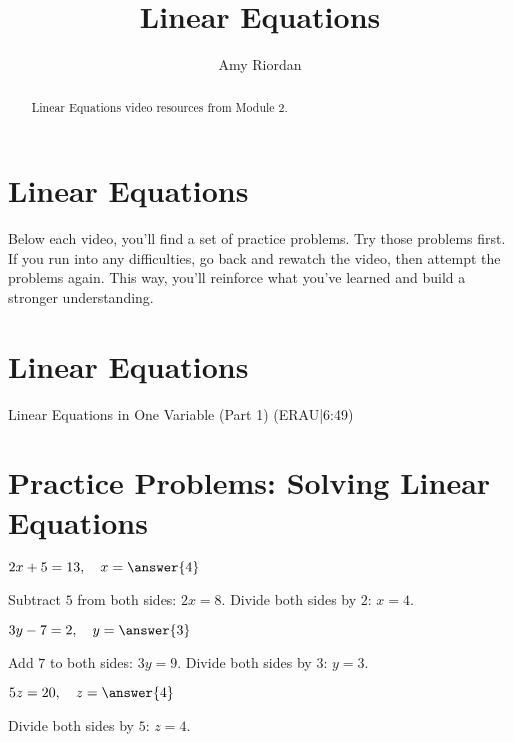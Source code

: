 \documentclass{ximera}
\title{Linear Equations}
\author{Amy Riordan}
\begin{document}
\begin{abstract}
Linear Equations video resources from Module 2.
\end{abstract}
\maketitle

\section*{Linear Equations}

Below each video, you’ll find a set of practice problems. Try those problems first. If you run into any difficulties, go back and rewatch the video, then attempt the problems again. This way, you’ll reinforce what you’ve learned and build a stronger understanding.

\section*{Linear Equations}

Linear Equations in One Variable (Part 1) (ERAU|6:49)



\section*{Practice Problems: Solving Linear Equations}

\begin{problem}
$2x + 5 = 13,\quad x = \answer{4}$
\begin{feedback}
Subtract $5$ from both sides: $2x = 8$. Divide both sides by $2$: $x = 4$.
\end{feedback}
\end{problem}

\begin{problem}
$3y - 7 = 2,\quad y = \answer{3}$
\begin{feedback}
Add $7$ to both sides: $3y = 9$. Divide both sides by $3$: $y = 3$.
\end{feedback}
\end{problem}

\begin{problem}
$5z = 20,\quad z = \answer{4}$
\begin{feedback}
Divide both sides by $5$: $z = 4$.
\end{feedback}
\end{problem}
\end{document}
